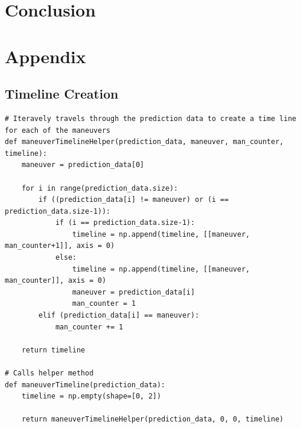 \documentclass{article}
\begin{document}
\section{Conclusion}


\appendix
\section{Appendix}
\subsection{Timeline Creation}
\label{sec:timeline}
\begin{lstlisting}
# Iteravely travels through the prediction data to create a time line for each of the maneuvers
def maneuverTimelineHelper(prediction_data, maneuver, man_counter, timeline):
	maneuver = prediction_data[0]

	for i in range(prediction_data.size):
		if ((prediction_data[i] != maneuver) or (i == prediction_data.size-1)):
			if (i == prediction_data.size-1):
				timeline = np.append(timeline, [[maneuver, man_counter+1]], axis = 0)
			else:
				timeline = np.append(timeline, [[maneuver, man_counter]], axis = 0)
				maneuver = prediction_data[i]
				man_counter = 1
		elif (prediction_data[i] == maneuver):
			man_counter += 1

	return timeline

# Calls helper method
def maneuverTimeline(prediction_data):
	timeline = np.empty(shape=[0, 2])

	return maneuverTimelineHelper(prediction_data, 0, 0, timeline)
\end{lstlisting}
\end{document}
